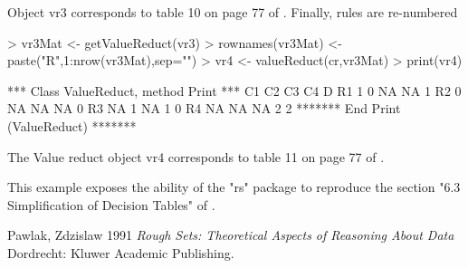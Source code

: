 \documentclass[a4paper]{article}
\begin{document}
Object vr3 corresponds to table 10 on page 77 of \cite{pawlak}. Finally, rules are re-numbered

\begin{Schunk}
\begin{Sinput}
> vr3Mat <-  getValueReduct(vr3)
> rownames(vr3Mat) <- paste("R",1:nrow(vr3Mat),sep="")
> vr4 <- valueReduct(cr,vr3Mat)
> print(vr4)
\end{Sinput}
\begin{Soutput}
*** Class ValueReduct, method Print *** 
   C1 C2 C3 C4 D
R1 1  0  NA NA 1
R2 0  NA NA NA 0
R3 NA 1  NA 1  0
R4 NA NA NA 2  2
******* End Print (ValueReduct) ******* 
\end{Soutput}
\end{Schunk}

The Value reduct object vr4 corresponds to table 11 on page 77 of \cite{pawlak}.


This example exposes the ability of the "rs" package to reproduce the section "6.3 Simplification of Decision Tables" of \cite{pawlak}.


\begin{thebibliography}{9}
 Pawlak, Zdzislaw 1991 \emph{Rough Sets: Theoretical Aspects of Reasoning About Data} Dordrecht: Kluwer Academic Publishing.
\end{thebibliography}
\end{document}
